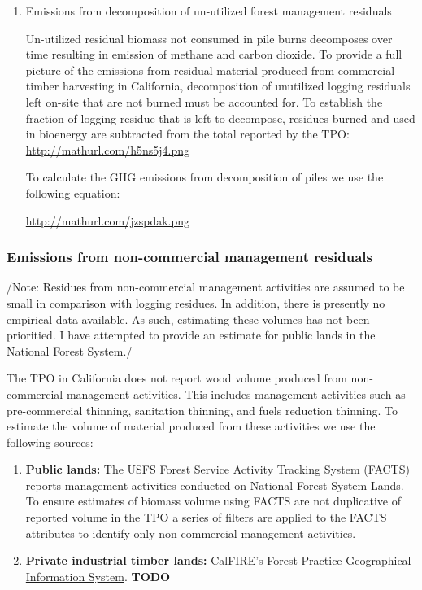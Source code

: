 \documentclass[a4paper]{article}
\begin{document}
\begin{enumerate}
\item Emissions from decomposition of un-utilized forest management
\label{sec:orgheadline7}
residuals

Un-utilized residual biomass not consumed in pile burns decomposes over
time resulting in emission of methane and carbon dioxide. To provide a
full picture of the emissions from residual material produced from
commercial timber harvesting in California, decomposition of unutilized
logging residuals left on-site that are not burned must be accounted
for. To establish the fraction of logging residue that is left to
decompose, residues burned and used in bioenergy are subtracted from the
total reported by the TPO: \url{http://mathurl.com/h5ns5j4.png}

To calculate the GHG emissions from decomposition of piles we use the
following equation:

\url{http://mathurl.com/jzspdak.png}
\end{enumerate}
\subsubsection{Emissions from non-commercial management residuals}
\label{sec:orgheadline10}

/Note: Residues from non-commercial management activities are assumed to
be small in comparison with logging residues. In addition, there is
presently no empirical data available. As such, estimating these volumes
has not been prioritied. I have attempted to provide an estimate for
public lands in the National Forest System./

The TPO in California does not report wood volume produced from
non-commercial management activities. This includes management
activities such as pre-commercial thinning, sanitation thinning, and
fuels reduction thinning. To estimate the volume of material produced
from these activities we use the following sources:

\begin{enumerate}
\item \textbf{Public lands:} The USFS Forest Service Activity Tracking System
(FACTS) reports management activities conducted on National Forest
System Lands. To ensure estimates of biomass volume using FACTS are
not duplicative of reported volume in the TPO a series of filters are
applied to the FACTS attributes to identify only non-commercial
management activities.
\item \textbf{Private industrial timber lands:} CalFIRE's
\href{http://www.calfire.ca.gov/resource_mgt/resource_mgt_forestpractice_gis}{Forest
Practice Geographical Information System}. \textbf{TODO}
\end{enumerate}
\end{document}
